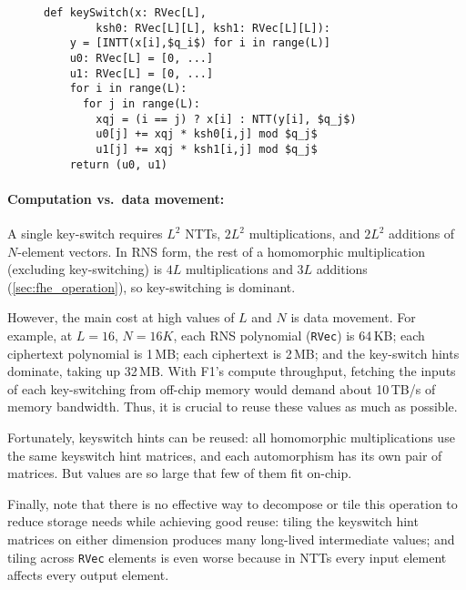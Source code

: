 \begin{figure}
\begin{center}
  \begin{lstlisting}[caption={Standard keyswitch implementation. \texttt{RVec} is an $N$-element vector of 32-bit values, storing a single RNS polynomial in either the coefficient or the NTT domain.
    }, mathescape=true, style=custompython, label=listing:keyswitch]
  def keySwitch(x: RVec[L],
        ksh0: RVec[L][L], ksh1: RVec[L][L]):
    y = [INTT(x[i],$q_i$) for i in range(L)]
    u0: RVec[L] = [0, ...]
    u1: RVec[L] = [0, ...]
    for i in range(L):
      for j in range(L):
        xqj = (i == j) ? x[i] : NTT(y[i], $q_j$)
        u0[j] += xqj * ksh0[i,j] mod $q_j$
        u1[j] += xqj * ksh1[i,j] mod $q_j$
    return (u0, u1)
  \end{lstlisting}
\end{center}
\end{figure}


\paragraph{Computation vs.\ data movement:}
A single key-switch requires $L^2$ NTTs, $2L^2$ multiplications, and $2L^2$
additions of $N$-element \mbox{vectors}. In RNS form, the rest of a homomorphic
multiplication (excluding key-switching) is $4L$ multiplications and $3L$
additions (\autoref{sec:fhe_operation}), so key-switching is dominant.

However, the main cost at high values of $L$ and $N$ is data movement. For
example, at $L = 16$, $N = 16K$, each RNS polynomial (\texttt{RVec}) is 64\,KB;
each ciphertext polynomial is 1\,MB; each ciphertext is 2\,MB; and the
key-switch hints dominate, taking up 32\,MB. With F1's compute throughput,
fetching the inputs of each key-switching from off-chip memory would demand
about 10\,TB/s of memory bandwidth. Thus, it is crucial to reuse these values
as much as possible.

Fortunately, keyswitch hints can be reused: all homomorphic multiplications
use the same keyswitch hint matrices, and each automorphism has its own pair
of matrices. But values are so large that few of them fit on-chip.

Finally, note that there is no effective way to decompose or tile this
operation to reduce storage needs while achieving good reuse: tiling the
keyswitch hint matrices on either dimension produces many long-lived
intermediate values; and tiling across \texttt{RVec} elements is even worse
because in NTTs every input element affects every output element.

